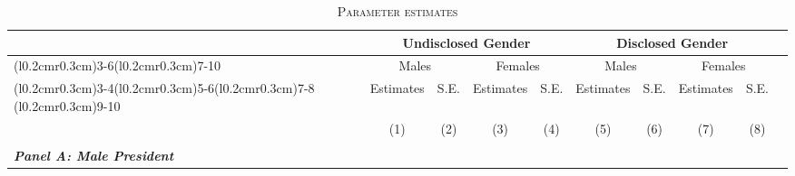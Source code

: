 \documentclass[12pt]{article}
\begin{document}
\restoregeometry
{}\begin{landscape}
\begin{table}[htbp]
\caption{\textsc{Parameter estimates}}\label{table:estimates_male_pres}
\centering
\begin{tabular}{lcccccccccc}
\hline
\hline& & \multicolumn{4}{c}{Undisclosed Gender} &\multicolumn{4}{c}{Disclosed Gender}\\
\cmidrule(l{0.2cm}r{0.3cm}){3-6}\cmidrule(l{0.2cm}r{0.3cm}){7-10}
& & \multicolumn{2}{c}{Males} &\multicolumn{2}{c}{Females} & \multicolumn{2}{c}{Males} &\multicolumn{2}{c}{Females}\\
\cmidrule(l{0.2cm}r{0.3cm}){3-4}\cmidrule(l{0.2cm}r{0.3cm}){5-6}\cmidrule(l{0.2cm}r{0.3cm}){7-8} \cmidrule(l{0.2cm}r{0.3cm}){9-10}
& & Estimates  & S.E.  & Estimates  & S.E. & Estimates  & S.E. & Estimates  & S.E. & \tabularnewline
 &  &  (1) & (2) & (3)  & (4) & (5) & (6) & (7) & (8) \\
\hline
\\
\textit{\textbf{Panel A: Male President}} & & & & & & & & & \\


\end{tabular}
\end{table}
\end{landscape}
\end{document}
